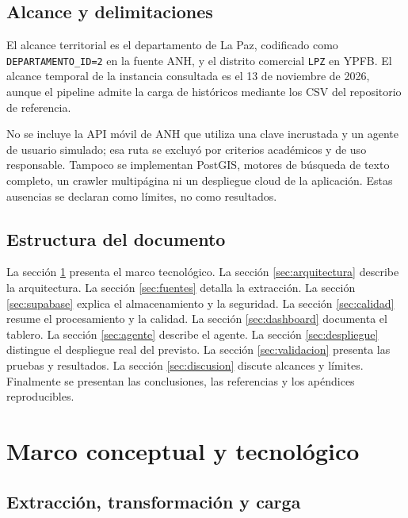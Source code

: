 \documentclass[12pt,a4paper]{article}
\begin{document}
\subsection{Alcance y delimitaciones}

El alcance territorial es el departamento de La Paz, codificado como \texttt{DEPARTAMENTO\_ID=2} en la fuente ANH, y el distrito comercial \texttt{LPZ} en YPFB. El alcance temporal de la instancia consultada es el 13 de noviembre de 2026, aunque el pipeline admite la carga de históricos mediante los CSV del repositorio de referencia.

No se incluye la API móvil de ANH que utiliza una clave incrustada y un agente de usuario simulado; esa ruta se excluyó por criterios académicos y de uso responsable. Tampoco se implementan PostGIS, motores de búsqueda de texto completo, un crawler multipágina ni un despliegue cloud de la aplicación. Estas ausencias se declaran como límites, no como resultados.

\subsection{Estructura del documento}

La sección \ref{sec:marco} presenta el marco tecnológico. La sección \ref{sec:arquitectura} describe la arquitectura. La sección \ref{sec:fuentes} detalla la extracción. La sección \ref{sec:supabase} explica el almacenamiento y la seguridad. La sección \ref{sec:calidad} resume el procesamiento y la calidad. La sección \ref{sec:dashboard} documenta el tablero. La sección \ref{sec:agente} describe el agente. La sección \ref{sec:despliegue} distingue el despliegue real del previsto. La sección \ref{sec:validacion} presenta las pruebas y resultados. La sección \ref{sec:discusion} discute alcances y límites. Finalmente se presentan las conclusiones, las referencias y los apéndices reproducibles.

\section{Marco conceptual y tecnológico}\label{sec:marco}

\subsection{Extracción, transformación y carga}
\end{document}
